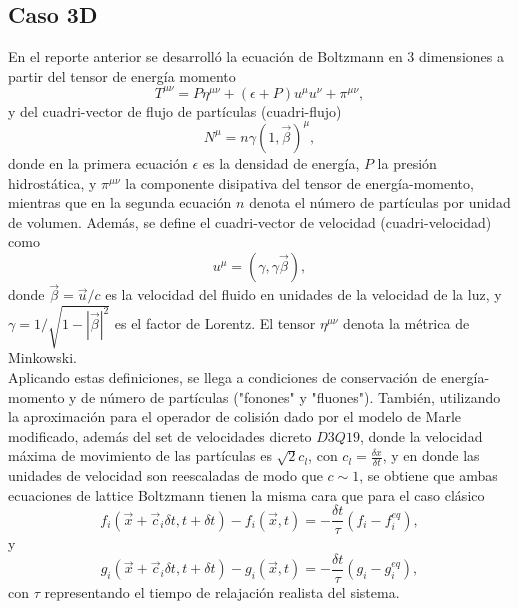 \documentclass{article}
\begin{document}
\subsection{Caso 3D}
En el reporte anterior se desarrolló la ecuación de Boltzmann en 3 dimensiones a partir del tensor de energía momento
\begin{equation}
    T^{\mu\nu} = P \eta^{\mu\nu} + (\epsilon + P) u^\mu u^\nu+ \pi^{\mu\nu},
\end{equation}
y del cuadri-vector de flujo de partículas (cuadri-flujo)
\begin{equation}
    N^\mu = n \gamma (1, \vec{\beta})^\mu, 
\end{equation}
donde en la primera ecuación $\epsilon$ es la densidad de energía, $P$ la presión hidrostática, y $\pi^{\mu\nu}$ la componente disipativa del tensor de energía-momento, mientras que en la segunda ecuación $n$ denota el número de partículas por unidad de volumen. Además, se define el cuadri-vector de velocidad (cuadri-velocidad) como 
\begin{equation}
    u^\mu = ( \gamma, \gamma \vec{\beta}),
\end{equation}
donde $\vec{\beta}= \vec{u}/c$ es la velocidad del fluido en unidades de la velocidad de la luz, y $\gamma =1/ \sqrt{1-|\vec{\beta}|^2}$ es el factor de Lorentz. El tensor $\eta^{\mu\nu}$ denota la métrica de Minkowski. \\

 Aplicando estas definiciones, se llega a condiciones de conservación de energía-momento y de número de partículas ("fonones" y "fluones"). También, utilizando la aproximación para el operador de colisión dado por el modelo de Marle modificado, además del set de velocidades dicreto $D3Q19$, donde la velocidad máxima de movimiento de las partículas es $\sqrt{2}c_l$, con $c_l = \frac{\delta x}{\delta t}$, y en donde las unidades de velocidad son reescaladas de modo que $c\sim 1$, se obtiene que ambas ecuaciones de lattice Boltzmann tienen la misma cara que para el caso clásico
\begin{equation}
    f_i(\vec{x} + \vec{c}_i\delta t, t + \delta t) -f_i (\vec{x}, t) = - \frac{\delta t}{\tau} (f_i - f_i^{eq}),
\end{equation}
y
\begin{equation}
    g_i(\vec{x} + \vec{c}_i\delta t, t + \delta t) -g_i (\vec{x}, t) = - \frac{\delta t}{\tau} (g_i - g_i^{eq}),
\end{equation}
con $\tau$ representando el tiempo de relajación realista del sistema.\\
\end{document}
